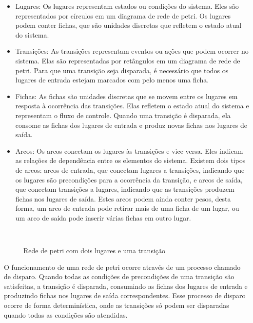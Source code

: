 \begin{itemize}
	\item Lugares: Os lugares representam estados ou condições do sistema. Eles são representados por círculos em um diagrama de rede de petri. Os lugares podem conter fichas, que são unidades discretas que refletem o estado atual do sistema.
	
	\item Transições: As transições representam eventos ou ações que podem ocorrer no sistema. Elas são representadas por retângulos em um diagrama de rede de petri. Para que uma transição seja disparada, é necessário que todos os lugares de entrada estejam marcados com pelo menos uma ficha.
	
	\item Fichas: As fichas são unidades discretas que se movem entre os lugares em resposta à ocorrência das transições. Elas refletem o estado atual do sistema e representam o fluxo de controle. Quando uma transição é disparada, ela consome as fichas dos lugares de entrada e produz novas fichas nos lugares de saída.
	
	\item Arcos: Os arcos conectam os lugares às transições e vice-versa. Eles indicam as relações de dependência entre os elementos do sistema. Existem dois tipos de arcos: arcos de entrada, que conectam lugares a transições, indicando que os lugares são precondições para a ocorrência da transição, e arcos de saída, que conectam transições a lugares, indicando que as transições produzem fichas nos lugares de saída. Estes arcos podem ainda conter pesos, desta forma, um arco de entrada pode retirar mais de uma ficha de um lugar, ou um arco de saída pode inserir várias fichas em outro lugar.
\end{itemize}

\begin{figure}[ht]
	\centering
	\caption{Rede de petri com dois lugares e uma transição}
	\\
	\label{fig:samplepetri}
\end{figure}

\pagebreak

O funcionamento de uma rede de petri ocorre através de um processo chamado de disparo. Quando todas as condições de precondições de uma transição são satisfeitas, a transição é disparada, consumindo as fichas dos lugares de entrada e produzindo fichas nos lugares de saída correspondentes. Esse processo de disparo ocorre de forma determinística, onde as transições só podem ser disparadas quando todas as condições são atendidas.

